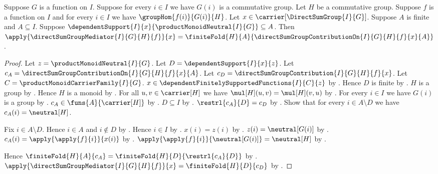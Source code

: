 \begin{theorem}\label{direct_sum_group_mediator_expand_support}
    Suppose $G$ is a function on $I$.
    Suppose for every $i\in I$ we have $G(i)$ is a commutative group.
    Let $H$ be a commutative group.
    Suppose $f$ is a function on $I$ and
        for every $i\in I$ we have $\groupHom{f(i)}{G(i)}{H}$.
    Let $x\in\carrier[\DirectSumGroup{I}{G}]$.
    Suppose $A$ is finite and $A\subseteq I$.
    Suppose
        $\dependentSupport{I}{x}{\productMonoidNeutral{I}{G}}
            \subseteq A$.
    Then
        $\apply{\directSumGroupMediator{I}{G}{H}{f}}{x}
            =\finiteFold{H}{A}{
                \directSumGroupContributionOn{I}{G}{H}{f}{x}{A}}$.
\end{theorem}
\begin{proof}
    Let $z=\productMonoidNeutral{I}{G}$.
    Let $D=\dependentSupport{I}{x}{z}$.
    Let $c_A=\directSumGroupContributionOn{I}{G}{H}{f}{x}{A}$.
    Let $c_D=\directSumGroupContribution{I}{G}{H}{f}{x}$.
    Let $C=\productMonoidCarrierFamily{I}{G}$.
    $x\in\dependentFinitelySupportedFunctions{I}{C}{z}$ by
        .
    Hence $D$ is finite by
        .
    $H$ is a group by .
    Hence $H$ is a monoid by .
    For all $u,v\in\carrier[H]$ we have
        $\mul[H](u,v)=\mul[H](v,u)$ by
        .
    For every $i\in I$ we have $G(i)$ is a group by
        .
    $c_A\in\funs{A}{\carrier[H]}$ by
        .
    $D\subseteq I$ by .
    $\restrl{c_A}{D}=c_D$ by
        .
    Show that for every $i\in A\setminus D$ we have
        $c_A(i)=\neutral[H]$.
    \begin{subproof}
        Fix $i\in A\setminus D$.
        Hence $i\in A$ and $i\notin D$ by .
        Hence $i\in I$ by .
        $x(i)=z(i)$ by .
        $z(i)=\neutral[G(i)]$ by
            .
        $c_A(i)=\apply{\apply{f}{i}}{x(i)}$ by
            .
        $\apply{\apply{f}{i}}{\neutral[G(i)]}=\neutral[H]$ by
            .
    \end{subproof}
    Hence $\finiteFold{H}{A}{c_A}
        =\finiteFold{H}{D}{\restrl{c_A}{D}}$ by
        .
    $\apply{\directSumGroupMediator{I}{G}{H}{f}}{x}
        =\finiteFold{H}{D}{c_D}$ by
        .
\end{proof}

